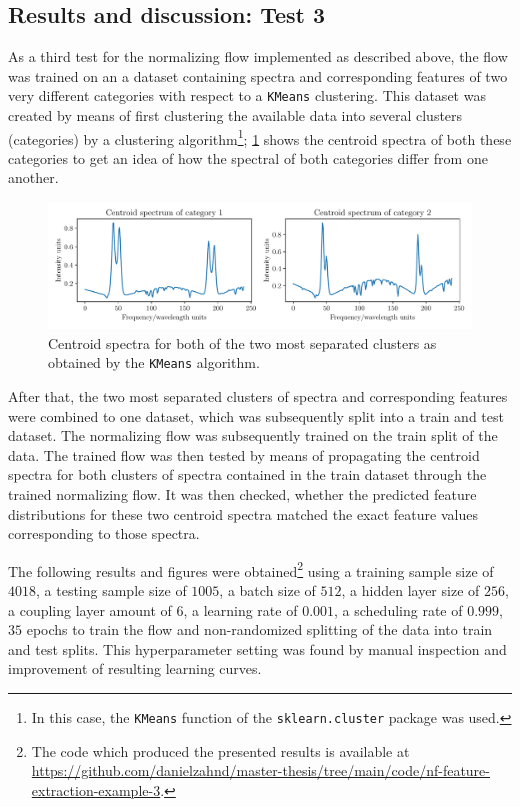 \documentclass[a4paper,12pt]{report}
\begin{document}
\subsection{Results and discussion: Test 3}
As a third test for the normalizing flow implemented as described above, the flow was trained on an a dataset containing spectra and corresponding features of two very different categories with respect to a \verb|KMeans| clustering. This dataset was created by means of first clustering the available data into several clusters (categories) by a clustering algorithm\cprotect\footnote{In this case, the \verb|KMeans| function of the \verb|sklearn.cluster| package was used.}; \cref{fig:nf-feature-extraction-example-3-spectra} shows the centroid spectra of both these categories to get an idea of how the spectral of both categories differ from one another.
\begin{figure}[h]
\centering
\includegraphics[width=\textwidth]{figures/nf-feature-extraction-example-3-spectra.pdf}
\cprotect\caption{Centroid spectra for both of the two most separated clusters as obtained by the \verb|KMeans| algorithm.}
\label{fig:nf-feature-extraction-example-3-spectra}
\end{figure}
After that, the two most separated clusters of spectra and corresponding features were combined to one dataset, which was subsequently split into a train and test dataset. The normalizing flow was subsequently trained on the train split of the data. The trained flow was then tested by means of propagating the centroid spectra for both clusters of spectra contained in the train dataset through the trained normalizing flow. It was then checked, whether the predicted feature distributions for these two centroid spectra matched the exact feature values corresponding to those spectra.

The following results and figures were obtained\footnote{The code which produced the presented results is available at \url{https://github.com/danielzahnd/master-thesis/tree/main/code/nf-feature-extraction-example-3}.} using a training sample size of $4018$, a testing sample size of $1005$, a batch size of $512$, a hidden layer size of $256$, a coupling layer amount of $6$, a learning rate of $0.001$, a scheduling rate of $0.999$, $35$ epochs to train the flow and non-randomized splitting of the data into train and test splits. This hyperparameter setting was found by manual inspection and improvement of resulting learning curves.
\end{document}
